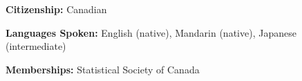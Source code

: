 \vspace*{10pt}
\noindent
\textbf{Citizenship:} Canadian\par
\vspace{3pt}

\noindent
\textbf{Languages Spoken:} English (native), Mandarin (native),
Japanese (intermediate)\par
\vspace{3pt}

\noindent
\textbf{Memberships:} Statistical Society of Canada\par